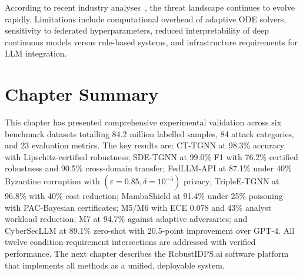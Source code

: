 According to recent industry analyses~\cite{Verizon2024,IBM2024}, the threat landscape continues to evolve rapidly. Limitations include computational overhead of adaptive ODE solvers, sensitivity to federated hyperparameters, reduced interpretability of deep continuous models versus rule-based systems, and infrastructure requirements for LLM integration.


\section{Chapter Summary}
\label{sec:ch4_summary}

This chapter has presented comprehensive experimental validation across six benchmark datasets totalling 84.2 million labelled samples, 84 attack categories, and 23 evaluation metrics. The key results are: CT-TGNN at 98.3\% accuracy with Lipschitz-certified robustness; SDE-TGNN at 99.0\% F1 with 76.2\% certified robustness and 90.5\% cross-domain transfer; FedLLM-API at 87.1\% under 40\% Byzantine corruption with $(\varepsilon{=}0.85,\delta{=}10^{-5})$ privacy; TripleE-TGNN at 96.8\% with 40\% cost reduction; MambaShield at 91.4\% under 25\% poisoning with PAC-Bayesian certificates; M5/M6 with ECE 0.078 and 43\% analyst workload reduction; M7 at 94.7\% against adaptive adversaries; and CyberSecLLM at 89.1\% zero-shot with 20.5-point improvement over GPT-4. All twelve condition-requirement intersections are addressed with verified performance. The next chapter describes the RobustIDPS.ai software platform that implements all methods as a unified, deployable system.

